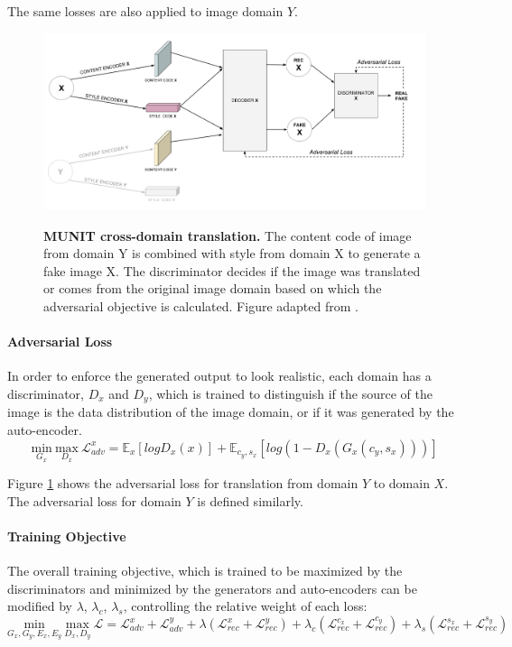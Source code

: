 \documentclass{article}
\begin{document}
The same losses are also applied to image domain $Y$.

\begin{figure}[h]
\centering
{\includegraphics[width=\linewidth]{GAN/munit_adv}}
\caption{\label{fig:munit_adv} \textbf{MUNIT cross-domain translation.} The content code of image from domain Y is combined with style from domain X to generate a fake image X. The discriminator decides if the image was translated or comes from the original image domain based on which the adversarial objective is calculated. Figure adapted from \cite{huang_multimodal_2018}.}
\end{figure}

\paragraph{Adversarial Loss}
In order to enforce the generated output to look realistic, each domain has a discriminator, $D_x$ and $D_y$, which is trained to distinguish if the source of the image is the data distribution of the image domain, or if it was generated by the auto-encoder.
\begin{equation}
\underset{G_x}{\mathrm{min}} \ \underset{D_x}{\mathrm{max}} \ \mathcal{L}^{x}_{adv} = \mathbb{E}_{x}[logD_{x}(x)] + \mathbb{E}_{c_{y}, s_{x}}[log(1 - D_{x}(G_{x}(c_{y}, s_{x})))]
\end{equation}

Figure \ref{fig:munit_adv} shows the adversarial loss for translation from domain $Y$ to domain $X$. The adversarial loss for domain $Y$ is defined similarly.


\paragraph{Training Objective}
The overall training objective, which is trained to be maximized by the discriminators and minimized by the generators and auto-encoders can be modified by $\lambda$, $\lambda_c$, $\lambda_s$, controlling the relative weight of each loss:
\begin{equation}
\underset{G_x, G_y, E_x, E_y}{\mathrm{min}} \ \underset{D_x, D_y}{\mathrm{max}} \ \mathcal{L} = \mathcal{L}^{x}_{adv} + \mathcal{L}^{y}_{adv} + 
\lambda(\mathcal{L}^{x}_{rec} + \mathcal{L}^{y}_{rec}) + 
\lambda_c(\mathcal{L}^{c_x}_{rec} + \mathcal{L}^{c_y}_{rec}) + 
\lambda_s(\mathcal{L}^{s_x}_{rec} + \mathcal{L}^{s_y}_{rec})
\end{equation}
\end{document}
